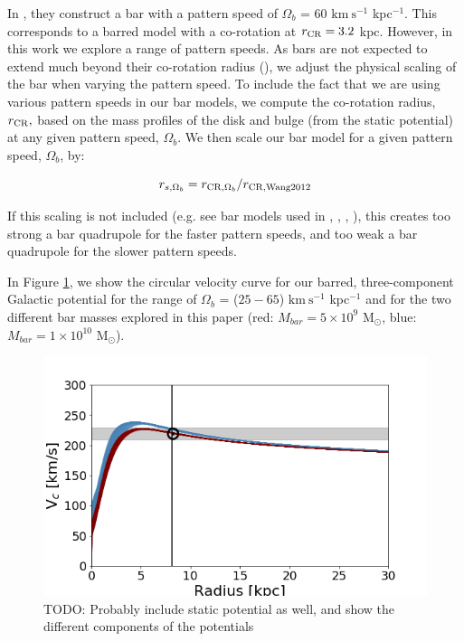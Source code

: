\documentclass[modern]{aastex62}
\newcommand{\msun}{\textrm{M}_\odot}
\newcommand{\kms}{\ensuremath{\textrm{km}~\textrm{s}^{-1}}}
\newcommand{\todo}[1]{{\color{red} TODO: #1}}
\begin{document}
In \citet{wang:2012}, they construct a bar with a pattern speed of $\Omega_b$ =  60 $\kms$ kpc$^{-1}$. This corresponds to a barred model with a co-rotation at $r_{\rm CR} = 3.2$ kpc. However, in this work we explore a range of pattern speeds. As bars are not expected to extend much beyond their co-rotation radius (\citealt{binney:2008}), we adjust the physical scaling of the bar when varying the pattern speed. %
To include the fact that we are using various pattern speeds in our bar models, we  compute the co-rotation radius, $r_{\rm CR},$ based on the mass profiles of the disk and bulge (from the static potential) at any given pattern speed, $\Omega_b$. We then scale our bar model for a given pattern speed, $\Omega_b$, by:

\begin{equation} 
r_{s, \Omega_b}  = r_{{\rm CR}, \Omega_b}/r_{{\rm CR, Wang 2012}}
\end{equation} 

If this scaling is not included (e.g. see bar models used in \citealt{price:2016b}, \citealt{Pearson:2017}, \citealt{Erkal:2017}, \citealt{Banik:2019}), this creates too strong a bar quadrupole for the faster pattern speeds, and too weak a bar quadrupole for the slower pattern speeds. 

In Figure \ref{fig:vcirc}, we show the circular velocity curve for our barred, three-component Galactic potential for the range of  $\Omega_b$ = ($25 - 65$) $\kms$ kpc$^{-1}$ and for the two different bar masses explored in this paper (red: $M_{bar} = 5 \times 10^{9}$ $\msun$, blue: $M_{bar} = 1 \times 10^{10}$ $\msun$).

\begin{figure}
\centerline{\includegraphics[width=\columnwidth]{v_circ_nlm919.png}}
\caption{\todo{Probably include static potential as well, and show the different components of the potentials }}
\label{fig:vcirc}
\end{figure}
\end{document}
